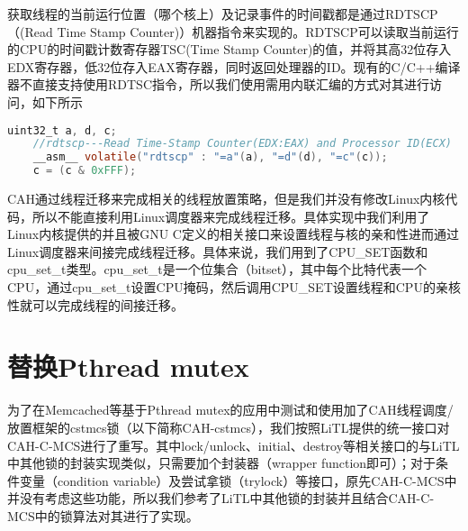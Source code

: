 获取线程的当前运行位置（哪个核上）及记录事件的时间戳都是通过RDTSCP（(Read Time Stamp Counter)）机器指令来实现的。RDTSCP可以读取当前运行的CPU的时间戳计数寄存器TSC(Time Stamp Counter)的值，并将其高32位存入EDX寄存器，低32位存入EAX寄存器，同时返回处理器的ID。现有的C/C++编译器不直接支持使用RDTSC指令，所以我们使用需用内联汇编的方式对其进行访问，如下所示
\begin{lstlisting}[language={C}, caption={通过内联汇编来使用RDTSCP指令}]
    uint32_t a, d, c;
    //rdtscp---Read Time-Stamp Counter(EDX:EAX) and Processor ID(ECX)
    __asm__ volatile("rdtscp" : "=a"(a), "=d"(d), "=c"(c));
    c = (c & 0xFFF);
\end{lstlisting}

CAH通过线程迁移来完成相关的线程放置策略，但是我们并没有修改Linux内核代码，所以不能直接利用Linux调度器来完成线程迁移。具体实现中我们利用了Linux内核提供的并且被GNU C定义的相关接口来设置线程与核的亲和性进而通过Linux调度器来间接完成线程迁移。具体来说，我们用到了CPU\_SET函数和cpu\_set\_t类型。cpu\_set\_t是一个位集合（bitset），其中每个比特代表一个CPU，通过cpu\_set\_t设置CPU掩码，然后调用CPU\_SET设置线程和CPU的亲核性就可以完成线程的间接迁移。

\section{替换Pthread mutex}
为了在Memcached等基于Pthread mutex的应用中测试和使用加了CAH线程调度/放置框架的cstmcs锁（以下简称CAH-cstmcs），我们按照LiTL提供的统一接口对CAH-C-MCS进行了重写。其中lock/unlock、initial、destroy等相关接口的与LiTL中其他锁的封装实现类似，只需要加个封装器（wrapper function即可）；对于条件变量（condition variable）及尝试拿锁（trylock）等接口，原先CAH-C-MCS中并没有考虑这些功能，所以我们参考了LiTL中其他锁的封装并且结合CAH-C-MCS中的锁算法对其进行了实现。

